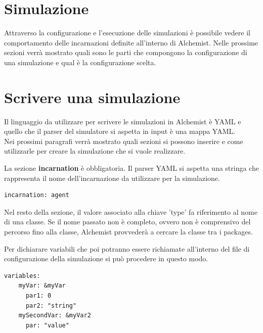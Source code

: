 \documentclass[12pt,a4paper,openright,twoside]{report}
\begin{document}
\section{Simulazione}
Attraverso la configurazione e l'esecuzione delle simulazioni \`e possibile vedere il comportamento delle incarnazioni definite all'interno di Alchemist. Nelle prossime sezioni verr\`a mostrato quali sono le parti che compongono la configurazione di una simulazione e qual \`e la configurazione scelta.

\section{Scrivere una simulazione}
Il linguaggio da utilizzare per scrivere le simulazioni in Alchemist \`e YAML e quello che il parser del simulatore si aspetta in input \`e una mappa YAML.
\\
Nei prossimi paragrafi verr\`a mostrato quali sezioni si possono inserire e come utilizzarle per creare la simulazione che si vuole realizzare.

La sezione \textbf{incarnation} \`e obbligatoria. Il parser YAML si aspetta una stringa che rappresenta il nome dell'incarnazione da utilizzare per la simulazione.
\medskip
\begin{lstlisting}[firstnumber=last,caption={Incarnazione}]
  incarnation: agent
\end{lstlisting}

Nel resto della sezione, il valore associato alla chiave 'type' fa riferimento al nome di una classe. Se il nome passato non \`e completo, ovvero non \`e comprensivo del percorso fino alla classe, Alchemist provveder\`a a cercare la classe tra i packages.

Per dichiarare variabili che poi potranno essere richiamate all'interno del file di configurazione della simulazione si pu\`o procedere in questo modo.
\medskip
\begin{lstlisting}[firstnumber=last,caption={Variabili simulazione}]
  variables:
    myVar: &myVar
      par1: 0
      par2: "string"
    mySecondVar: &myVar2
      par: "value"
\end{lstlisting}
\end{document}
